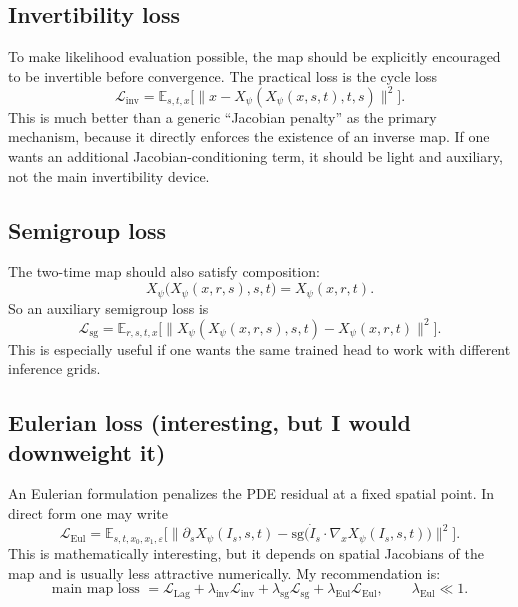 \documentclass[11pt]{article}
\newcommand{\E}{\mathbb{E}}
\newcommand{\sg}{\mathrm{sg}}
\newcommand{\grad}{\nabla}
\newcommand{\flow}{X_{\psi}}
\begin{document}
\subsection{Invertibility loss}

To make likelihood evaluation possible, the map should be explicitly encouraged to be invertible before convergence. The practical loss is the cycle loss
\begin{equation}
\mathcal{L}_{\mathrm{inv}}
=
\E_{s,t,x}
\Big[
\big\| x - \flow(\flow(x,s,t),t,s) \big\|^2
\Big].
\label{eq:L_inv}
\end{equation}
This is much better than a generic ``Jacobian penalty'' as the primary mechanism, because it directly enforces the existence of an inverse map. If one wants an additional Jacobian-conditioning term, it should be light and auxiliary, not the main invertibility device.

\subsection{Semigroup loss}

The two-time map should also satisfy composition:
\begin{equation}
\flow\big(\flow(x,r,s),s,t\big) = \flow(x,r,t).
\label{eq:semigroup_identity}
\end{equation}
So an auxiliary semigroup loss is
\begin{equation}
\mathcal{L}_{\mathrm{sg}}
=
\E_{r,s,t,x}
\Big[
\big\| \flow(\flow(x,r,s),s,t) - \flow(x,r,t) \big\|^2
\Big].
\label{eq:L_sg}
\end{equation}
This is especially useful if one wants the same trained head to work with different inference grids.

\subsection{Eulerian loss (interesting, but I would downweight it)}

An Eulerian formulation penalizes the PDE residual at a fixed spatial point. In direct form one may write
\begin{equation}
\mathcal{L}_{\mathrm{Eul}}
=
\E_{s,t,x_0,x_1,\varepsilon}
\Big[
\big\| \partial_s \flow(I_s,s,t) - \sg\big( \dot I_s \cdot \grad_x \flow(I_s,s,t) \big) \big\|^2
\Big].
\label{eq:L_eul}
\end{equation}
This is mathematically interesting, but it depends on spatial Jacobians of the map and is usually less attractive numerically. My recommendation is:
\begin{equation}
\text{main map loss } = \mathcal{L}_{\mathrm{Lag}} + \lambda_{\mathrm{inv}} \mathcal{L}_{\mathrm{inv}} + \lambda_{\mathrm{sg}} \mathcal{L}_{\mathrm{sg}} + \lambda_{\mathrm{Eul}} \mathcal{L}_{\mathrm{Eul}},
\qquad \lambda_{\mathrm{Eul}} \ll 1.
\label{eq:map_total}
\end{equation}
\end{document}

